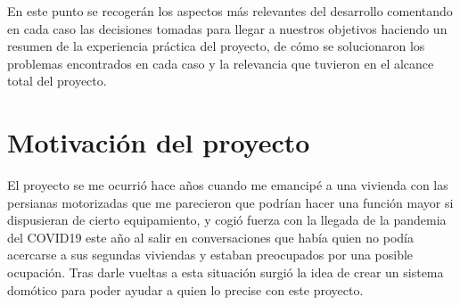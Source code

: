 \begin{comment}
Este apartado pretende recoger los aspectos más interesantes del desarrollo del proyecto, comentados por los autores del mismo.
Debe incluir desde la exposición del ciclo de vida utilizado, hasta los detalles de mayor relevancia de las fases de análisis, diseño e implementación.
Se busca que no sea una mera operación de copiar y pegar diagramas y extractos del código fuente, sino que realmente se justifiquen los caminos de solución que se han tomado, especialmente aquellos que no sean triviales.
Puede ser el lugar más adecuado para documentar los aspectos más interesantes del diseño y de la implementación, con un mayor hincapié en aspectos tales como el tipo de arquitectura elegido, los índices de las tablas de la base de datos, normalización y desnormalización, distribución en ficheros3, reglas de negocio dentro de las bases de datos (EDVHV GH GDWRV DFWLYDV), aspectos de desarrollo relacionados con el WWW...
Este apartado, debe convertirse en el resumen de la experiencia práctica del proyecto, y por sí mismo justifica que la memoria se convierta en un documento útil, fuente de referencia para los autores, los tutores y futuros alumnos.

\end{comment}

En este punto se recogerán los aspectos más relevantes del desarrollo comentando en cada caso las decisiones tomadas para llegar a nuestros objetivos haciendo un resumen de la experiencia práctica del proyecto, de cómo se solucionaron los problemas encontrados en cada caso y la relevancia que tuvieron en el alcance total del proyecto.

\section{Motivación del proyecto}
El proyecto se me ocurrió hace años cuando me emancipé a una vivienda con las persianas motorizadas que me parecieron que podrían hacer una función mayor si dispusieran de cierto equipamiento, y cogió fuerza con la llegada de la pandemia del COVID19 este año al salir en conversaciones que había quien no podía acercarse a sus segundas viviendas y estaban preocupados por una posible ocupación. Tras darle vueltas a esta situación surgió la idea de crear un sistema domótico para poder ayudar a quien lo precise con este proyecto.

